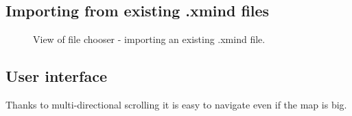 \subsection{Importing from existing .xmind files}
\label{subsec:import}

\begin{figure}[h]
	\centering
	\caption{View of file chooser - importing an existing .xmind file.}
	\label{fig:screen-filechooser}
\end{figure}


\subsection{User interface}
\label{subsec:ui}
Thanks to multi-directional scrolling it is easy to navigate even if the map is big.

